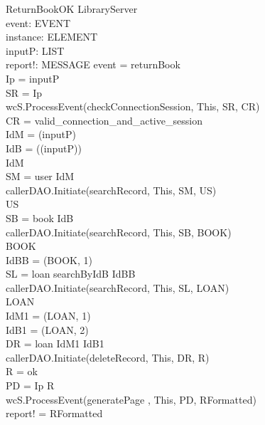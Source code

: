 \begin{schema}{ReturnBookOK}
\Delta LibraryServer \\
event: EVENT \\
instance: ELEMENT \\
inputP: LIST \\
report!: MESSAGE
\where event = returnBook \\
Ip = \head inputP \\
SR = \lseq Ip \rseq \\ 
wcS.ProcessEvent(checkConnectionSession, This, SR, CR) \\
CR = valid\_connection\_and\_active\_session \\
IdM = \head (\tail inputP) \\
IdB = \head (\tail (\tail inputP)) \\
IdM  \\
SM = \lseq user IdM \rseq \\
callerDAO.Initiate(searchRecord, This, SM, US) \\
US \neq \emptyset \\
SB = \lseq book IdB \rseq \\
callerDAO.Initiate(searchRecord, This, SB, BOOK) \\
BOOK \neq \emptyset \\
IdBB = \nth (\head BOOK, 1) \\
SL = \lseq loan searchByIdB IdBB \rseq \\
callerDAO.Initiate(searchRecord, This, SL, LOAN) \\
LOAN \neq \emptyset \\
IdM1 = \nth(\head LOAN, 1) \\
IdB1 = \nth(\head LOAN, 2) \\
DR = \lseq loan IdM1 IdB1 \rseq \\
callerDAO.Initiate(deleteRecord, This, DR, R) \\
R = ok \\
PD = \lseq Ip R \rseq \\
wcS.ProcessEvent(generatePage , This, PD, RFormatted) \\
report! = RFormatted 
\end{schema}

